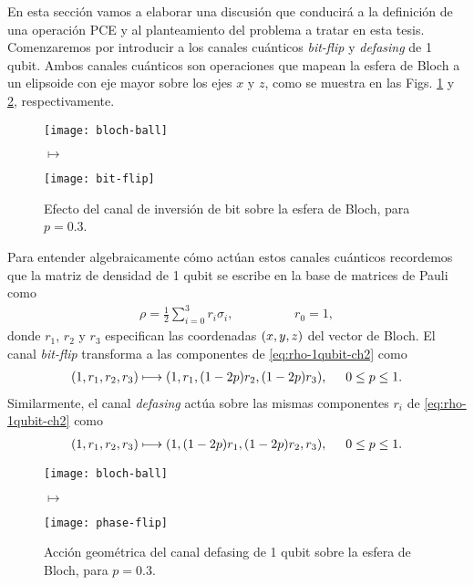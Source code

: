 En esta sección vamos a elaborar una discusión que conducirá a
la definición de una operación PCE y al planteamiento del problema
a tratar en esta tesis. 
Comenzaremos por introducir a los canales cuánticos  
\textit{bit-flip} y \textit{defasing} de 1 qubit. 
Ambos canales cuánticos son operaciones que mapean 
la esfera de Bloch a un elipsoide con eje mayor sobre los ejes $x$ y $z$, 
como se muestra en las Figs. \ref{fig:bit-flip} y \ref{fig:phase-flip}, 
respectivamente.
\begin{figure}
\centering
\begin{minipage}{.4\textwidth}
    \centering
    \texttt{[image: bloch-ball]}
\end{minipage}
\LARGE{$\longmapsto$}
\begin{minipage}{0.4\textwidth}
    \centering
    \texttt{[image: bit-flip]}
\end{minipage}
\caption{
Efecto del canal de inversión de bit sobre la esfera de Bloch, para $p=0.3$. \ep}
\label{fig:bit-flip}
\end{figure}
Para entender algebraicamente cómo actúan estos canales cuánticos 
recordemos que la matriz de densidad de 1 qubit se escribe en la 
base de matrices de Pauli como
\begin{align}\label{eq:rho-1qubit-ch2}
\rho=\frac{1}{2}\sum_{i=0}^3r_i\sigma_i,\hspace{2cm}r_0=1,
\end{align}
donde $r_1$, $r_2$ y $r_3$ especifican las coordenadas $\qty(x,y,z)$ 
del vector de Bloch. El canal \textit{bit-flip} transforma a las componentes 
de \eqref{eq:rho-1qubit-ch2} como~\cite{nielsen_chuang_2011}
\begin{align}\label{eq:bit-flip-transformation}
\qty(1,r_1,r_2,r_3)\longmapsto \qty(1,r_1,(1-2p)r_2,(1-2p)r_3),
\hspace{.5cm} 0\leq p\leq 1.
\end{align}
Similarmente, el canal \textit{defasing} actúa sobre las mismas
componentes $r_i$ de \eqref{eq:rho-1qubit-ch2}
como~\cite{nielsen_chuang_2011}
\begin{align}\label{eq:defasing-transformation}
\qty(1,r_1,r_2,r_3)\longmapsto \qty(1,(1-2p)r_1,(1-2p)r_2,r_3),
\hspace{.5cm} 0\leq p\leq 1.
\end{align}
\begin{figure}
\centering
\begin{minipage}{.4\textwidth}
    \centering
    \texttt{[image: bloch-ball]}
\end{minipage}
\LARGE{$\longmapsto$}
\begin{minipage}{0.4\textwidth}
    \centering
    \texttt{[image: phase-flip]}
\end{minipage}
\caption{
Acción geométrica del canal defasing de 1 qubit sobre la 
esfera de Bloch, para $p=0.3$. \ep}
\label{fig:phase-flip}
\end{figure}
